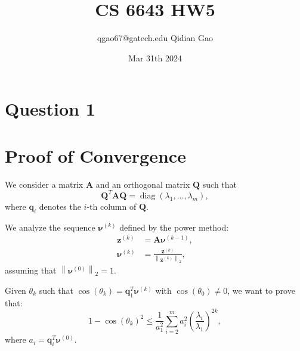 \documentclass{article}
\title{CS 6643 HW5}
\author{qgao67@gatech.edu Qidian Gao}
\date{Mar 31th 2024}
\begin{document}
\maketitle
\section{Question 1}
\section*{Proof of Convergence}

We consider a matrix $\boldsymbol{A}$ and an orthogonal matrix $\boldsymbol{Q}$ such that
\[
\boldsymbol{Q}^T \boldsymbol{A} \boldsymbol{Q}=\operatorname{diag}\left(\lambda_1, \ldots, \lambda_m\right),
\]
where $\boldsymbol{q}_i$ denotes the $i$-th column of $\boldsymbol{Q}$.

We analyze the sequence $\boldsymbol{\nu}^{(k)}$ defined by the power method:
\begin{align*}
\boldsymbol{z}^{(k)} &= \boldsymbol{A} \boldsymbol{\nu}^{(k-1)}, \\
\boldsymbol{\nu}^{(k)} &= \frac{\boldsymbol{z}^{(k)}}{\left\|\boldsymbol{z}^{(k)}\right\|_2},
\end{align*}
assuming that $\left\|\boldsymbol{\nu}^{(0)}\right\|_2=1$.

Given $\theta_k$ such that $\cos(\theta_k)=\boldsymbol{q}_1^T \boldsymbol{\nu}^{(k)}$ with $\cos(\theta_0) \neq 0$, we want to prove that:
\[
1 - \cos(\theta_k)^2 \leq \frac{1}{a_1^2} \sum_{i=2}^m a_i^2 \left(\frac{\lambda_i}{\lambda_1}\right)^{2k},
\]
where $a_i = \boldsymbol{q}_i^T \boldsymbol{\nu}^{(0)}$.
\end{document}
